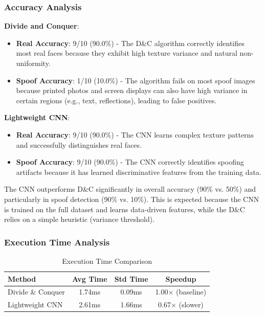 \documentclass[conference]{IEEEtran}
\begin{document}
\subsubsection{Accuracy Analysis}

\textbf{Divide and Conquer}:
\begin{itemize}
    \item \textbf{Real Accuracy}: 9/10 (90.0\%) - The D\&C algorithm correctly identifies most real faces because they exhibit high texture variance and natural non-uniformity.
    \item \textbf{Spoof Accuracy}: 1/10 (10.0\%) - The algorithm fails on most spoof images because printed photos and screen displays can also have high variance in certain regions (e.g., text, reflections), leading to false positives.
\end{itemize}

\textbf{Lightweight CNN}:
\begin{itemize}
    \item \textbf{Real Accuracy}: 9/10 (90.0\%) - The CNN learns complex texture patterns and successfully distinguishes real faces.
    \item \textbf{Spoof Accuracy}: 9/10 (90.0\%) - The CNN correctly identifies spoofing artifacts because it has learned discriminative features from the training data.
\end{itemize}

The CNN outperforms D\&C significantly in overall accuracy (90\% vs. 50\%) and particularly in spoof detection (90\% vs. 10\%). This is expected because the CNN is trained on the full dataset and learns data-driven features, while the D\&C relies on a simple heuristic (variance threshold).

\subsubsection{Execution Time Analysis}

\begin{table}[htbp]
\centering
\caption{Execution Time Comparison}
\label{tab:time}
\begin{tabular}{@{}lccc@{}}
\toprule
\textbf{Method} & \textbf{Avg Time} & \textbf{Std Time} & \textbf{Speedup} \\
\midrule
Divide \& Conquer & 1.74ms & 0.09ms & 1.00$\times$ (baseline) \\
Lightweight CNN & 2.61ms & 1.66ms & 0.67$\times$ (slower) \\
\bottomrule
\end{tabular}
\end{table}
\end{document}
